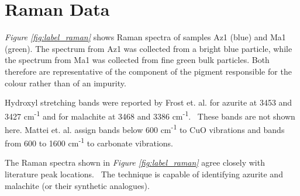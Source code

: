 
\section[Raman Data]{Raman Data}
\label{section3.3}

\textit{Figure \ref{fig:label_raman}} shows Raman spectra of samples Az1 (blue) and Ma1 (green). The spectrum from Az1 was collected from a bright blue particle, while the spectrum from Ma1 was collected from fine green bulk particles. Both therefore are representative of the component of the pigment responsible for the colour rather than of an impurity.

Hydroxyl stretching bands were reported by Frost et. al. for azurite at 3453 and 3427 cm\textsuperscript{-1} and for malachite at 3468 and 3386 cm\textsuperscript{-1}.~\autocite{Frost} These bands are not shown here. Mattei et. al. assign bands below 600 cm\textsuperscript{-1} to CuO vibrations and bands from 600 to 1600 cm\textsuperscript{-1} to carbonate vibrations.~\autocite{Mattei}

The Raman spectra shown in \textit{Figure \ref{fig:label_raman}} agree closely with literature peak locations.~\autocite{Mattei,Frost,Bicchieri} The technique is capable of identifying azurite and malachite (or their synthetic analogues).

